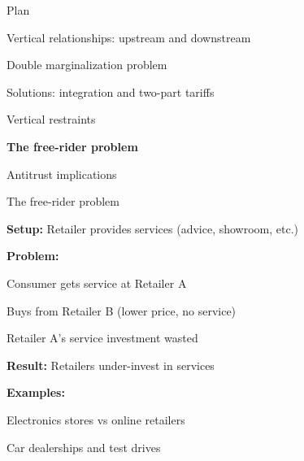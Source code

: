 \documentclass[notes,11pt, aspectratio=169]{beamer}
\newenvironment{wideitemize}{\itemize\addtolength{\itemsep}{10pt}}{\enditemize}
\newenvironment{wideenumerate}{\enumerate\addtolength{\itemsep}{10pt}}{\endenumerate}
\begin{document}
\begin{frame}{Plan}
  \begin{wideenumerate}
    \item Vertical relationships: upstream and downstream
    \item Double marginalization problem
    \item Solutions: integration and two-part tariffs
    \item Vertical restraints
    \item \textbf{The free-rider problem}
    \item Antitrust implications
  \end{wideenumerate}
\end{frame}

\begin{frame}{The free-rider problem}
	\begin{wideitemize}
		\item \textbf{Setup:} Retailer provides services (advice, showroom, etc.)
		\item \textbf{Problem:}
		\begin{wideitemize}
			\vspace{5pt}
			\item Consumer gets service at Retailer A
			\item Buys from Retailer B (lower price, no service)
			\item Retailer A's service investment wasted
		\end{wideitemize}
		\item \textbf{Result:} Retailers under-invest in services
		\item \textbf{Examples:}
		\begin{wideitemize}
			\vspace{5pt}
			\item Electronics stores vs online retailers
			\item Car dealerships and test drives
		\end{wideitemize}
	\end{wideitemize}
\end{frame}
\end{document}
